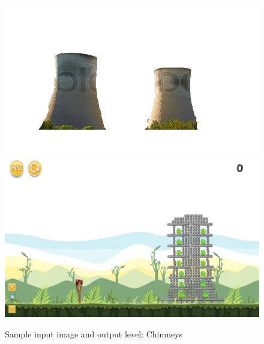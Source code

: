 \documentclass{dalthesis}
\begin{document}
\begin{figure}
	\caption{Sample input image and output level: Chimneys}
  \includegraphics[width=\textwidth,height=\textheight,keepaspectratio]{levels/pictures/mechanisms/chimneys.jpg}
  \includegraphics[width=\textwidth,height=\textheight,keepaspectratio]{levels/screenshots/mechanisms/chimneys.png}
\end{figure}
\end{document}
